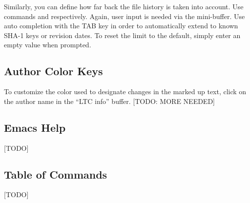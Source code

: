 Similarly, you can define how far back the file history is taken into account.  Use commands  
and  respectively.  Again, user input is needed via the mini-buffer.  Use auto completion with the TAB key in order to automatically extend to known SHA-1 keys or revision dates.  To reset the limit to the default, simply enter an empty value when prompted.

\subsection{Author Color Keys}

To customize the color used to designate changes in the marked up text, click on the author name in the ``LTC info'' buffer. [TODO: MORE NEEDED]

\subsection{Emacs Help}

[TODO]

\subsection{Table of Commands}

[TODO]